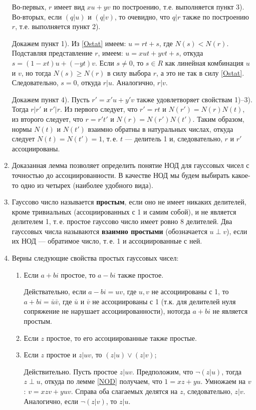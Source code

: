 \begin{enumerate}
Во-первых, $r$ имеет вид $xu+yv$ по построению, т.е. выполняется пункт 3). Во-вторых, если $(q|u)$ и $(q|v)$, то очевидно, что $q|r$ также по построению $r$, т.е. выполняется пункт 2).

Докажем пункт 1).
Из \eqref{Ostat} имеем: $u=rt+s$, где $N(s)<N(r)$. Подставляя представление $r$, имеем:
$u=xut+yvt+s$, откуда $s=(1-xt)u+(-yt)v$. Если $s\ne 0$, то $s\in R$ как линейная комбинация $u$ и $v$, но тогда $N(s)\ge N(r)$ в силу выбора $r$, а это не так в силу \eqref{Ostat}. Следовательно, $s=0$, откуда $r|u$. Аналогично, $r|v$.

Докажем пункт 4). Пусть $r'=x'u+y'v$ также удовлетворяет свойствам 1)--3). Тогда $r|r'$ и $r'|r$. Из первого следует, что $r'=rt$ и $N(r')=N(r)N(t)$, из второго следует, что $r=r't'$ и $N(r)=N(r')N(t')$. Таким образом, нормы $N(t)$ и $N(t')$ взаимно обратны в натуральных числах, откуда следует $N(t)=N(t')=1$, т.\,е. $t$ --- делитель 1 и, следовательно, $r$ и $r'$ ассоциированы.
\epf

\item Доказанная лемма позволяет определить понятие НОД для гауссовых чисел с точностью до ассоциированности. В качестве НОД мы будем выбирать какое-то одно из четырех (наиболее удобного вида).

\item Гауссово число называется \textbf{простым}, если оно не имеет никаких делителей, кроме тривиальных (ассоциированных с 1 и самим собой), и не является делителем 1, т.\,е. простое гауссово число имеет ровно 8 делителей. Два гауссовых числа называются \textbf{взаимно простыми} (обозначается $u\perp v$), если их НОД --- обратимое число, т.\,е. 1 и ассоциированные с ней.

\item Верны следующие свойства простых гауссовых чисел:
\begin{enumerate}
\item Если $a+bi$ простое, то $a-bi$ также простое.

Действательно, если $a-bi=uv$, где $u,v$ не ассоциированы с 1, то $a+bi=\bar u\bar v$, где $\bar u$ и $\bar v$ не ассоциированы  с 1 (т.к. для делителей нуля сопряжение не нарушает ассоциированности), нотогда $a+bi$ не является простым.
\item Если $z$ простое, то его ассоциированные также простые.
\item Если $z$ простое и $z|uv$, то $(z|u)\vee(z|v)$;

Действительно. Пусть простое $z|uv$. Предположим, что $\neg(z|u)$, тогда $z\perp u$, откуда по лемме \ref{NOD} получаем, что $1=xz+yu$. Умножаем на $v$: $v=xzv+yuv$. Справа оба слагаемых делятся на $z$, следовательно, $z|v$. Аналогично, если $\neg(z|v)$, то $z|u$.


\end{enumerate}
\end{enumerate}
